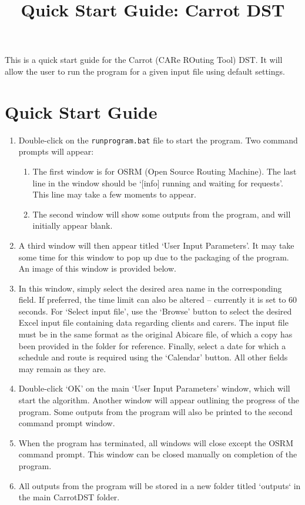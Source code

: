 \documentclass[a4paper]{article}
\begin{document}
\title{\vspace{-25mm}Quick Start Guide: Carrot DST\vspace{-15mm}}
\date{}
\maketitle

This is a quick start guide for the Carrot (CARe ROuting Tool) DST. It will allow the user to run the program for a given input file using default settings.

\section{Quick Start Guide}
\begin{enumerate}[leftmargin=*]
	\item Double-click on the \texttt{runprogram.bat} file to start the program. Two command prompts will appear:
	\begin{enumerate}
		\item The first window is for OSRM (Open Source Routing Machine). The last line in the window should be `[info] running and waiting for requests'. This line may take a few moments to appear.
		\item The second window will show some outputs from the program, and will initially appear blank.
	\end{enumerate}
	\item A third window will then appear titled `User Input Parameters'. It may take some time for this window to pop up due to the packaging of the program. An image of this window is provided below.
	\item In this window, simply select the desired area name in the corresponding field. If preferred, the time limit can also be altered -- currently it is set to 60 seconds. For `Select input file', use the `Browse' button to select the desired Excel input file containing data regarding clients and carers. The input file must be in the same format as the original Abicare file, of which a copy has been provided in the folder for reference. Finally, select a date for which a schedule and route is required using the `Calendar' button. All other fields may remain as they are.
	\item Double-click `OK' on the main `User Input Parameters' window, which will start the algorithm. Another window will appear outlining the progress of the program. Some outputs from the program will also be printed to the second command prompt window.
	\item When the program has terminated, all windows will close except the OSRM command prompt. This window can be closed manually on completion of the program.
	\item All outputs from the program will be stored in a new folder titled `outputs` in the main CarrotDST folder.
\end{enumerate}
\end{document}
